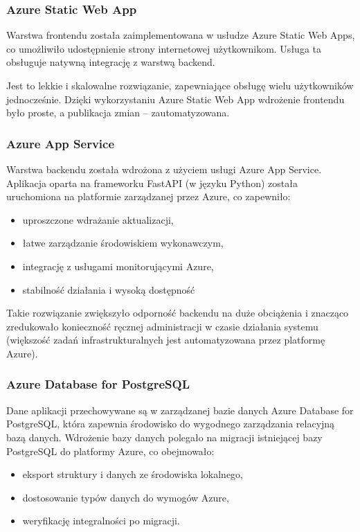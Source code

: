 \documentclass[a4paper,twoside,12pt]{book}
\begin{document}
\subsubsection{Azure Static Web App}
Warstwa frontendu została zaimplementowana w usłudze Azure Static Web Apps, co umożliwiło udostępnienie strony internetowej użytkownikom. Usługa ta obsługuje natywną integrację z warstwą backend.

Jest to lekkie i skalowalne rozwiązanie, zapewniające obsługę wielu użytkowników jednocześnie. Dzięki wykorzystaniu Azure Static Web App wdrożenie frontendu było proste, a publikacja zmian – zautomatyzowana.

\subsubsection{Azure App Service}
Warstwa backendu została wdrożona z użyciem usługi Azure App Service. Aplikacja oparta na frameworku FastAPI (w języku Python) została uruchomiona na platformie zarządzanej przez Azure, co zapewniło:
\begin{itemize}
    \item uproszczone wdrażanie aktualizacji,
    \item łatwe zarządzanie środowiskiem wykonawczym,
    \item integrację z usługami monitorującymi Azure,
    \item stabilność działania i wysoką dostępność
\end{itemize}

Takie rozwiązanie zwiększyło odporność backendu na duże obciążenia i znacząco zredukowało konieczność ręcznej administracji w czasie działania systemu (większość zadań infrastrukturalnych jest automatyzowana przez platformę Azure).

\subsubsection{Azure Database for PostgreSQL}
Dane aplikacji przechowywane są w zarządzanej bazie danych Azure Database for PostgreSQL, która zapewnia środowisko do wygodnego zarządzania relacyjną bazą danych. Wdrożenie bazy danych polegało na migracji istniejącej bazy PostgreSQL do platformy Azure, co obejmowało:

\begin{itemize}
    \item eksport struktury i danych ze środowiska lokalnego,
    \item dostosowanie typów danych do wymogów Azure,
    \item weryfikację integralności po migracji.
\end{itemize}
\end{document}
